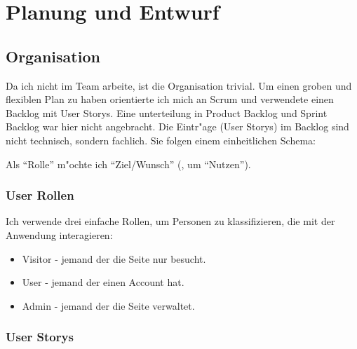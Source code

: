 

\chapter{Planung und Entwurf}\label{ch:planung-und-entwurf}


\section{Organisation}\label{sec:organisation}
Da ich nicht im Team arbeite, ist die Organisation trivial.
Um einen groben und flexiblen Plan zu haben orientierte ich mich an Scrum und verwendete einen Backlog mit User Storys.
Eine unterteilung in Product Backlog und Sprint Backlog war hier nicht angebracht.
Die Eintr{"a}ge (User Storys) im Backlog sind nicht technisch, sondern fachlich.
Sie folgen einem einheitlichen Schema:
\begin{center}
    Als ``Rolle'' m{"o}chte ich ``Ziel/Wunsch'' (, um ``Nutzen'').
\end{center}

\subsection{User Rollen}\label{subsec:user-rollen}
Ich verwende drei einfache Rollen, um Personen zu klassifizieren, die mit der Anwendung interagieren:
\begin{itemize}
    \item Visitor - jemand der die Seite nur besucht.
    \item User - jemand der einen Account hat.
    \item Admin - jemand der die Seite verwaltet.
\end{itemize}

\subsection{User Storys}\label{subsec:user-storys}

